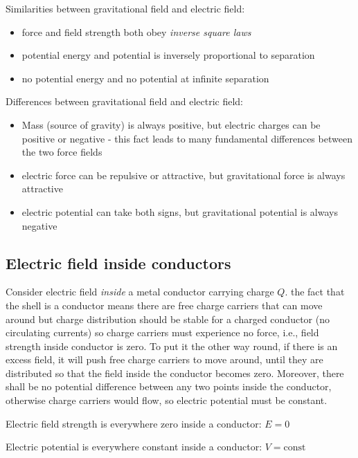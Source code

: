 \documentclass[a4paper,12pt]{book}
\newenvironment{ilight}
  {\centering
  	\vspace*{6pt}
  	\begin{tcolorbox}[colframe=Gray,colback=LightGrey!15]
  \setlength{\baselineskip}{\baselineskip}%
  }
  {\end{tcolorbox}\vspace*{-4pt}}
\begin{document}
Similarities between gravitational field and electric field:

\begin{itemize}
	\item[-] force and field strength both obey \emph{inverse square laws}
	
	\item[-] potential energy and potential is inversely proportional to separation
	
	\item[-] no potential energy and no potential at infinite separation
\end{itemize}

Differences between gravitational field and electric field:

\begin{itemize}

\item[-] Mass (source of gravity) is always positive, but electric charges can be positive or negative - this fact leads to many fundamental differences between the two force fields
\item[-] electric force can be repulsive or attractive, but gravitational force is always attractive

\item[-] electric potential can take both signs, but gravitational potential is always negative
\end{itemize}

\subsection{Electric field inside conductors}\label{inside-conductors}

Consider electric field \emph{inside} a metal conductor carrying charge $Q$. the fact that the shell is a conductor means there are free charge carriers that can move around but charge distribution should be stable for a charged conductor (no circulating currents) so charge carriers must experience no force, i.e., field strength inside conductor is zero. To put it the other way round, if there is an excess field, it will push free charge carriers to move around, until they are distributed so that the field inside the conductor becomes zero. Moreover, there shall be no potential difference between any two points inside the conductor, otherwise charge carriers would flow, so electric potential must be constant.

\begin{ilight}
	\centering
	
	Electric field strength is everywhere zero inside a conductor: $E=0$
	
	Electric potential is everywhere constant inside a conductor: $V=\text{const}$
\end{ilight}
\end{document}

